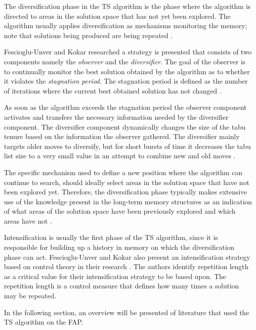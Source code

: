 The diversification phase in the TS algorithm is the phase where the algorithm is directed to areas in the solution space that has not yet been explored. The algorithm usually applies diversification as mechanisms monitoring the memory; note that solutions being produced are being repeated \cite{ReactiveTabuVHR,SelfControllingReactiveTabu}. 

Fescioglu-Unver and Kokar \cite{SelfControllingReactiveTabu} researched a strategy is presented that consists of two components namely the \emph{observer} and the \emph{diversifier}. The goal of the observer is to continually monitor the best solution obtained by the algorithm as to whether it violates the \emph{stagnation period}. The stagnation period is defined as the number of iterations where the current best obtained solution has not changed \cite{SelfControllingReactiveTabu}. 

As soon as the algorithm exceeds the stagnation period the observer component activates and transfers the necessary information needed by the diversifier component. The diversifier component dynamically changes the size of the tabu tenure based on the information the observer gathered. The diversifier mainly targets older moves to diversify, but for short bursts of time it decreases the tabu list size to a very small value in an attempt to combine new and old moves \cite{SelfControllingReactiveTabu}.

The specific mechanism used to define a new position where the algorithm can continue to search, should ideally select areas in the solution space that have not been explored yet. Therefore, the diversification phase typically makes extensive use of the knowledge present in the long-term memory structures as an indication of what areas of the solution space have been previously explored and which areas have not \cite{TabuParameterization,TabuCrewSchedulingProblem,NonlinearGlobalTabu,SelfControllingReactiveTabu}.

Intensification is usually the first phase of the TS algorithm, since it is responsible for building up a history in memory on which the diversification phase can act. Fescioglu-Unver and Kokar also present an intensification strategy based on control theory in their research \cite{SelfControllingReactiveTabu}. The authors identify repetition length as a critical value for their intensification strategy to be based upon. The repetition length is a control measure that defines how many times a solution may be repeated.

In the following section, an overview will be presented of literature that used the TS algorithm on the FAP.
